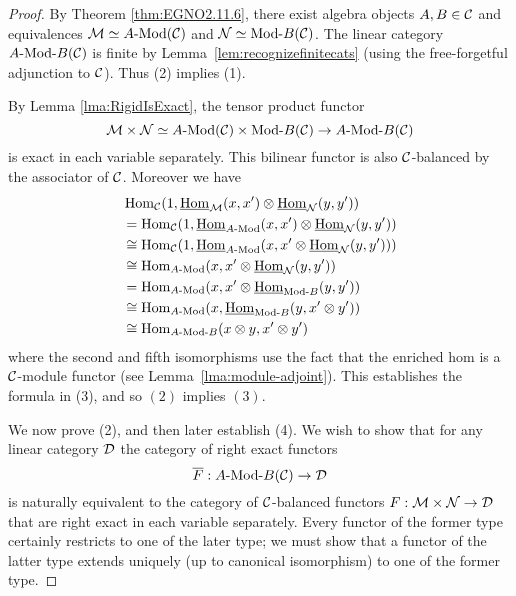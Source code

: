 \documentclass{amsart}
\begin{document}
\begin{proof}  
	 By Theorem \ref{thm:EGNO2.11.6}, there exist algebra objects $A, B \in \mathcal C$ and equivalences $\cM \simeq \Mod{A}{}(\cC)$ and $\cN \simeq \Mod{}{B}(\cC)$. The linear category $\Mod{A }{B}(\cC)$ is finite by Lemma~\ref{lem:recognizefinitecats} (using the free-forgetful adjunction to $\mathcal C$).  Thus (2) implies (1).
	 
	 By Lemma \ref{lma:RigidIsExact}, the tensor product functor
	\begin{equation*}
		\cM \times \cN \simeq \Mod{A}{}(\cC) \times  \Mod{}{B}(\cC) \to \Mod{A}{B}(\cC)
	\end{equation*}
	is exact in each variable separately.  This bilinear functor is also $\mathcal C$-balanced by the associator of $\mathcal C$. Moreover we have
	\begin{align*}
		&\Hom_{\cC}(1, \IHom_{\cM}(x,x') \otimes \IHom_{\cN}(y, y')) \\
		& = \Hom_{\cC}(1, \IHom_{\Mod{A}{}}(x,x') \otimes \IHom_{\cN}(y, y')) \\
		&\cong \Hom_{\cC}(1, \IHom_{\Mod{A}{}}(x,x' \otimes \IHom_{\cN}(y, y')) ) \\
		& \cong \Hom_{\Mod{A}{}}(x, x' \otimes \IHom_{\cN}(y, y') ) \\
		& = \Hom_{\Mod{A}{}}(x, x' \otimes \IHom_{\Mod{}{B}}(y, y') )\\
		& \cong \Hom_{\Mod{A}{}}(x,  \IHom_{\Mod{}{B}}(y, x' \otimes y') )\\
		& \cong \Hom_{\Mod{A}{B}}(x \otimes y, x' \otimes y')
	\end{align*} 
where the second and fifth isomorphisms use the fact that the enriched hom is a $\mathcal C$-module functor (see Lemma~\ref{lma:module-adjoint}). This establishes the formula in (3), and so $(2)$ implies $(3)$.

	We now prove (2), and then later establish (4).  We wish to show that for any linear category $\mathcal D$ the category of right exact functors 
\begin{equation*}
	\overline{F}:\Mod{A}{B}(\cC) \to \cD
\end{equation*}
	is naturally equivalent to the category of $\mathcal C$-balanced functors $F:\mathcal M \times \mathcal N \to \mathcal D$ that are right exact in each variable separately. Every functor of the former type certainly restricts to one of the later type; we must show that a functor of the latter type extends uniquely (up to canonical isomorphism) to one of the former type. 
	

\end{proof}
\end{document}

